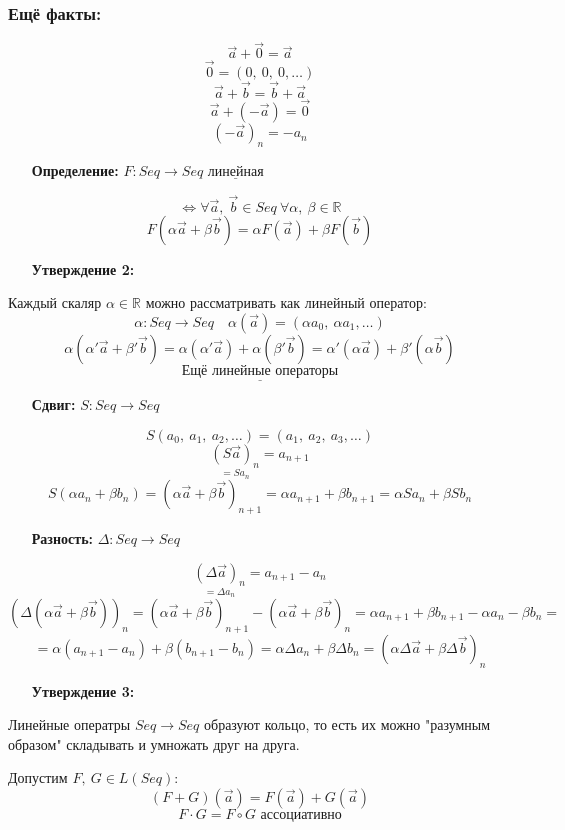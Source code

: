 \documentclass[12pt, letterpaper, twoside]{article}
\newcommand{\Underl}[1]{$\underline{\text{#1}}$}
\begin{document}
\subsubsection*{Ещё факты:}
\[\vec{a} + \vec{0} = \vec{a}\]
\[\vec{0} = (0,\ 0,\ 0,\dots)\]
\[\vec{a} + \vec{b} = \vec{b} + \vec{a}\]
\[\vec{a} + \left(-\vec{a}\right) = \vec{0}\]
\[\left(-\vec{a}\right)_n = -a_n\]
\begin{enumerate}
    \item[\textbf{Определение:}] $F: Seq\longrightarrow Seq$ \Underl{линейная}
\end{enumerate}
\[\Leftrightarrow \forall \vec{a},\ \vec{b} \in Seq\ \forall \alpha,\ \beta\in \mathbb{R}\]
\[F(\alpha \vec{a} + \beta\vec{b}) = \alpha F(\vec{a}) + \beta F(\vec{b})\]
\begin{enumerate}
    \item[\textbf{Утверждение 2:}]
\end{enumerate}
Каждый скаляр $\alpha \in \mathbb{R}$ можно рассматривать как линейный оператор:
\[\alpha: Seq\rightarrow Seq\quad \alpha(\vec{a}) = (\alpha a_0,\ \alpha a_1,\dots)\]
\[\alpha(\alpha'\vec{a} + \beta'\vec{b}) = \alpha (\alpha'\vec{a}) + \alpha (\beta'\vec{b}) = \alpha'(\alpha \vec{a}) + \beta'(\alpha \vec{b})\]
\[\underline{\text{Ещё линейные операторы}}\]
\begin{enumerate}
    \item[\textbf{Сдвиг:}] $S: Seq\longrightarrow Seq$
\end{enumerate}
\[S(a_0,\ a_1,\ a_2,\dots) = (a_1,\ a_2,\ a_3,\dots)\]
\[\underset{=Sa_n}{\left(S\vec{a}\right)_n} = a_{n + 1}\]
\[S(\alpha a_n + \beta b_n) = \left(\alpha \vec{a} + \beta \vec{b} \right)_{n + 1} = \alpha a_{n + 1} + \beta b_{n + 1} = \alpha Sa_{n} + \beta Sb_{n}\]
\begin{enumerate}
    \item[\textbf{Разность:}] $\Delta: Seq\longrightarrow Seq$
\end{enumerate}
\[\underset{=\Delta a_n}{\left(\Delta \vec{a}\right)_n} = a_{n + 1} - a_{n}\]
\newpage
\[\left(\Delta\left(\alpha \vec{a} + \beta \vec{b} \right) \right)_n = \left( \alpha \vec{a} + \beta \vec{b} \right)_{n + 1} - \left(\alpha \vec{a} + \beta \vec{b}\right)_{n} = \alpha a_{n + 1} + \beta b_{n + 1} - \alpha a_n - \beta b_n =\]
\[= \alpha(a_{n + 1} - a_n) + \beta(b_{n + 1} - b_n) = \alpha \Delta a_n + \beta\Delta b_n = \left(\alpha \Delta \vec{a} + \beta \Delta \vec{b}\right)_n\]
\begin{enumerate}
    \item[\textbf{Утверждение 3:}]
\end{enumerate}
Линейные оператры $Seq\longrightarrow Seq$ образуют кольцо, то есть их можно "разумным образом" складывать и умножать друг на друга.\par
Допустим $F,\ G\in L(Seq)$:
\[(F + G)(\vec{a}) = F(\vec{a}) + G(\vec{a})\]
\[F\cdot G = F\circ G\text{ ассоциативно}\]
\end{document}
